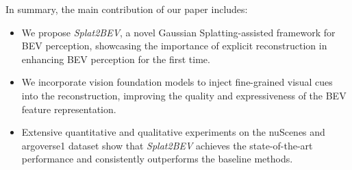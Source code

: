 In summary, the main contribution of our paper includes:
\begin{itemize}
    \item We propose \textit{Splat2BEV}, a novel Gaussian Splatting-assisted framework for BEV perception, showcasing the importance of explicit reconstruction in enhancing BEV perception for the first time.
    \item We incorporate vision foundation models to inject fine-grained visual cues into the reconstruction, improving the quality and expressiveness of the BEV feature representation.
    \item Extensive quantitative and qualitative experiments on the nuScenes and argoverse1 dataset  show that \textit{Splat2BEV} achieves the state-of-the-art performance and consistently outperforms the baseline methods.
\end{itemize}

